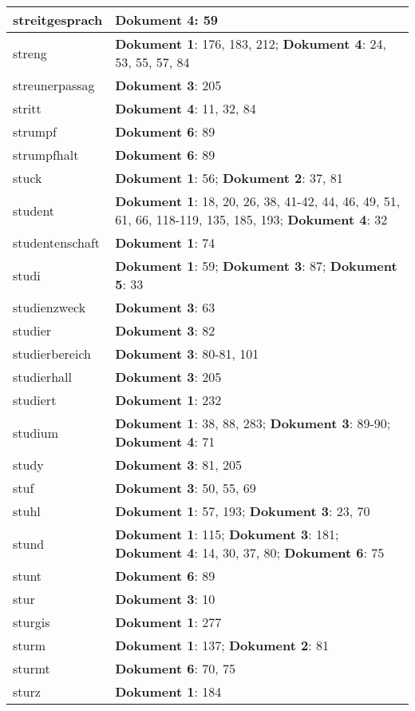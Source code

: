 \documentclass[a5paper]{article}
\begin{document}
\begin{longtable}[l]{|l|p{3in}|}
streitgesprach & \textbf{Dokument 4}: 59 \\
\hline
streng & \textbf{Dokument 1}: 176, 183, 212; \textbf{Dokument 4}: 24, 53, 55, 57, 84 \\
\hline
streunerpassag & \textbf{Dokument 3}: 205 \\
\hline
stritt & \textbf{Dokument 4}: 11, 32, 84 \\
\hline
strumpf & \textbf{Dokument 6}: 89 \\
\hline
strumpfhalt & \textbf{Dokument 6}: 89 \\
\hline
stuck & \textbf{Dokument 1}: 56; \textbf{Dokument 2}: 37, 81 \\
\hline
student & \textbf{Dokument 1}: 18, 20, 26, 38, 41-42, 44, 46, 49, 51, 61, 66, 118-119, 135, 185, 193; \textbf{Dokument 4}: 32 \\
\hline
studentenschaft & \textbf{Dokument 1}: 74 \\
\hline
studi & \textbf{Dokument 1}: 59; \textbf{Dokument 3}: 87; \textbf{Dokument 5}: 33 \\
\hline
studienzweck & \textbf{Dokument 3}: 63 \\
\hline
studier & \textbf{Dokument 3}: 82 \\
\hline
studierbereich & \textbf{Dokument 3}: 80-81, 101 \\
\hline
studierhall & \textbf{Dokument 3}: 205 \\
\hline
studiert & \textbf{Dokument 1}: 232 \\
\hline
studium & \textbf{Dokument 1}: 38, 88, 283; \textbf{Dokument 3}: 89-90; \textbf{Dokument 4}: 71 \\
\hline
study & \textbf{Dokument 3}: 81, 205 \\
\hline
stuf & \textbf{Dokument 3}: 50, 55, 69 \\
\hline
stuhl & \textbf{Dokument 1}: 57, 193; \textbf{Dokument 3}: 23, 70 \\
\hline
stund & \textbf{Dokument 1}: 115; \textbf{Dokument 3}: 181; \textbf{Dokument 4}: 14, 30, 37, 80; \textbf{Dokument 6}: 75 \\
\hline
stunt & \textbf{Dokument 6}: 89 \\
\hline
stur & \textbf{Dokument 3}: 10 \\
\hline
sturgis & \textbf{Dokument 1}: 277 \\
\hline
sturm & \textbf{Dokument 1}: 137; \textbf{Dokument 2}: 81 \\
\hline
sturmt & \textbf{Dokument 6}: 70, 75 \\
\hline
sturz & \textbf{Dokument 1}: 184 \\

\end{longtable}
\end{document}
